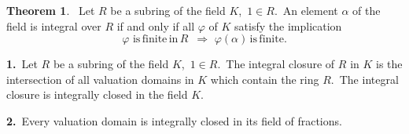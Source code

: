 \documentclass[12pt]{article}
\theoremstyle{definition}
\newtheorem*{thmplain}{Theorem}
\begin{document}
\begin{thmplain}
 \, Let $R$ be a subring of the field $K$, \,$1\in R$. \,An element $\alpha$ of the field is integral over $R$ if and only if all  $\varphi$ of $K$ satisfy the implication
     $$\varphi \mathrm{\,\,is\,finite\,in\,}R\,\,\,\Rightarrow
          \,\,\varphi(\alpha)\mathrm{\,is\,finite}.$$
\end{thmplain}

\textbf{ 1.} \,Let $R$ be a subring of the field $K$, \,$1\in R$. \,The integral closure of $R$ in $K$ is the intersection of all valuation domains in $K$ which contain the ring $R$. \,The integral closure is integrally closed in the field $K$.


\textbf{ 2.}  \,Every valuation domain is integrally closed in its field of fractions.
\end{document}
